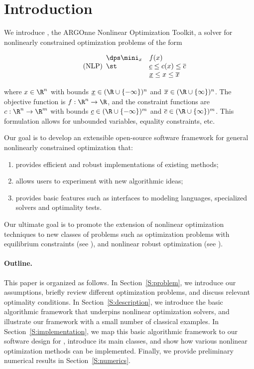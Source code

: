 \section{Introduction}

We introduce \solvername{}, the ARGOnne Nonlinear Optimization Toolkit, a solver for nonlinearly constrained optimization
problems of the form

\begin{equation}
\label{eq:NLP}
\tag{NLP}
\begin{array}{ll} \dps
\mini_x & f(x) \\
\st 	& \underline{c} \le c(x) \le \overline{c} \\
		& \underline{x} \le x \le \overline{x} \\
\end{array}
\end{equation}

where $x \in \R^n$ with bounds $\underline{x} \in (\R \cup \{-\infty\})^n$ and $\overline{x} \in (\R \cup \{\infty\})^n$.
The objective function is $f : \R^n \to \R$, and the constraint functions are $c: \R^n \to \R^m$ with bounds
$\underline{c} \in (\R \cup \{-\infty\})^m$ and $\overline{c} \in (\R \cup \{\infty\})^m$. This formulation allows
for unbounded variables, equality constraints, etc.

Our goal is to develop an extensible open-source software framework for general nonlinearly constrained optimization
that:
\begin{enumerate}
\item provides efficient and robust implementations of existing methods;
\item allows users to experiment with new algorithmic ideas;
\item provides basic features such as interfaces to modeling languages, specialized solvers and optimality tests.
\end{enumerate}

Our ultimate goal is to promote the extension of nonlinear optimization techniques to new classes of problems such
as optimization problems with equilibrium constraints (see \cite{OutKocZow:98,LuoPanRal:96,LeyLopNoc:06,Leyf:06,FletLeyf:04,FLRS:06}),
and nonlinear robust optimization (see \cite{Leyfferetal:18}).

\paragraph{Outline.} This paper is organized as follows. In Section~\ref{S:problem}, we introduce our assumptions,
briefly review different optimization problems, and discuss relevant optimality conditions. In Section~\ref{S:description},
we introduce the basic algorithmic framework that underpins nonlinear optimization solvers, and illustrate our
framework with a small number of classical examples. In Section~\ref{S:implementation}, we map this basic algorithmic framework
to our software design for \solvername{}, introduce its main classes, and show how various nonlinear optimization
methods can be implemented. Finally, we provide preliminary numerical results in Section~\ref{S:numerics}.
